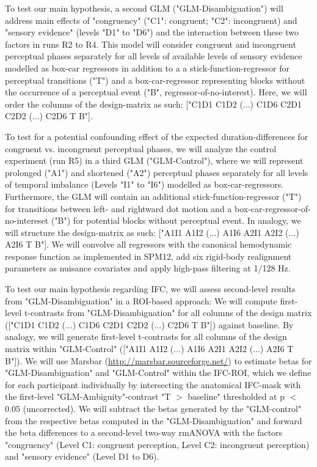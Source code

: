 \documentclass[12pt]{article}
\begin{document}
To test our main hypothesis, a second GLM ("GLM-Disambiguation") will address main effects of "congruency" ("C1": congruent; "C2": incongruent) and "sensory evidence" (levels "D1" to "D6") and the interaction between these two factors in runs R2 to R4. This model will consider congruent and incongruent perceptual phases separately for all levels of available levels of sensory evidence modelled as box-car regressors in addition to a a stick-function-regressor for perceptual transitions ("T") and a box-car-regressor representing blocks without the occurrence of a perceptual event ("B", regressor-of-no-interest). Here, we will order the columns of the design-matrix as such: ["C1D1 C1D2 (...) C1D6 C2D1 C2D2 (...) C2D6 T B"]. 

To test for a potential confounding effect of the expected duration-differences for congruent vs. incongruent perceptual phases, we will analyze the control experiment (run R5) in a third GLM ("GLM-Control"), where we will represent prolonged ("A1") and shortened ("A2") perceptual phases separately for all levels of temporal imbalance (Levels "I1" to "I6") modelled as box-car-regressors. Furthermore, the GLM will contain an additional stick-function-regressor ("T") for transitions between left- and rightward dot motion and a box-car-regressor-of-no-intereset ("B") for potential blocks without perceptual event. In analogy, we will structure the design-matrix as such: ["A1I1 A1I2 (...) A1I6 A2I1 A2I2 (...) A2I6 T B"]. 
We will convolve all regressors with the canonical hemodynamic response function as implemented in SPM12, add six rigid-body realignment parameters as nuisance covariates and apply high-pass filtering at 1/128 Hz. 

To test our main hypothesis regarding IFC, we will assess second-level results from "GLM-Disambiguation" in a ROI-based approach: We will compute first-level t-contrasts from "GLM-Disambiguation" for all columns of the design matrix (["C1D1 C1D2 (...) C1D6 C2D1 C2D2 (...) C2D6 T B"]) against baseline. By analogy, we will generate first-level t-contrasts for all columns of the design matrix within "GLM-Control" (["A1I1 A1I2 (...) A1I6 A2I1 A2I2 (...) A2I6 T B"]). We will use Marsbar (\url{http://marsbar.sourceforge.net/}) to estimate betas for "GLM-Disambiguation" and "GLM-Control" within the IFC-ROI, which we define for each participant individually by intersecting the anatomical IFC-mask with the first-level "GLM-Ambiguity"-contrast "T $>$ baseline" thresholded at p $<$ 0.05 (uncorrected). We will subtract the betas generated by the "GLM-control" from the respective betas computed in the "GLM-Disambiguation" and forward the beta differences to a second-level two-way rmANOVA with the factors "congruency" (Level C1: congruent perception, Level C2: incongruent perception) and "sensory evidence" (Level D1 to D6).
\end{document}

